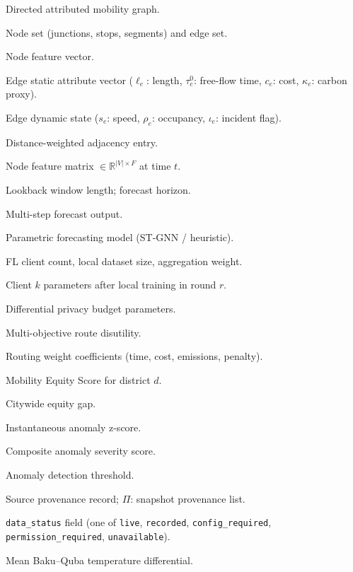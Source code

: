 
\begin{IEEEdescription}

\item[$G=(V,E,W)$] Directed attributed mobility graph.
\item[$V, E$] Node set (junctions, stops, segments) and edge set.
\item[$\mathbf{x}_v$] Node feature vector.
\item[$\mathbf{a}_e$] Edge static attribute vector ($\ell_e$: length, $\tau_e^0$: free-flow time, $c_e$: cost, $\kappa_e$: carbon proxy).
\item[$\mathbf{d}_e(t)$] Edge dynamic state ($s_e$: speed, $\rho_e$: occupancy, $\iota_e$: incident flag).
\item[$\tilde{A}_{uv}$] Distance-weighted adjacency entry.
\item[$\mathbf{X}_t$] Node feature matrix $\in\mathbb{R}^{|V|\times F}$ at time $t$.
\item[$T,\,H$] Lookback window length; forecast horizon.
\item[$\hat{\mathbf{Y}}_{t+1:t+H}$] Multi-step forecast output.
\item[$f_\theta$] Parametric forecasting model (ST-GNN / heuristic).
\item[$K,\,n_k,\,p_k$] FL client count, local dataset size, aggregation weight.
\item[$\theta_k^{(r)}$] Client $k$ parameters after local training in round $r$.
\item[$\varepsilon,\,\delta$] Differential privacy budget parameters.
\item[$J(r)$] Multi-objective route disutility.
\item[$\alpha,\beta,\gamma,\delta$] Routing weight coefficients (time, cost, emissions, penalty).
\item[$\MES_d$] Mobility Equity Score for district $d$.
\item[$\Delta_{\MES}$] Citywide equity gap.
\item[$z_t$] Instantaneous anomaly z-score.
\item[$S_t$] Composite anomaly severity score.
\item[$\tau_S$] Anomaly detection threshold.
\item[$\pi_s$] Source provenance record; $\Pi$: snapshot provenance list.
\item[$\DS$] \texttt{data\_status} field (one of \texttt{live}, \texttt{recorded}, \texttt{config\_required}, \texttt{permission\_required}, \texttt{unavailable}).
\item[$\overline{\Delta T}$] Mean Baku--Quba temperature differential.

\end{IEEEdescription}
